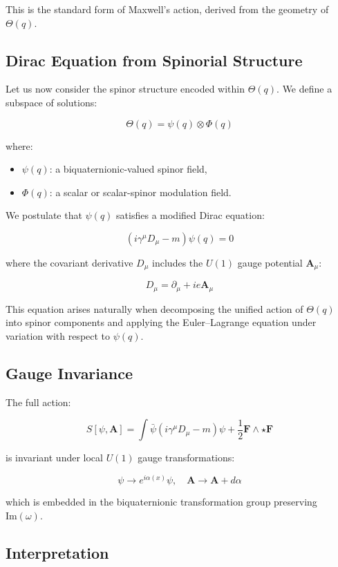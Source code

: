 This is the standard form of Maxwell's action, derived from the geometry of \(\Theta(q)\).

\subsection*{Dirac Equation from Spinorial Structure}

Let us now consider the spinor structure encoded within \(\Theta(q)\). We define a subspace of solutions:

\[
\Theta(q) = \psi(q) \otimes \Phi(q)
\]

where:
\begin{itemize}
  \item \(\psi(q)\): a biquaternionic-valued spinor field,
  \item \(\Phi(q)\): a scalar or scalar-spinor modulation field.
\end{itemize}

We postulate that \(\psi(q)\) satisfies a modified Dirac equation:

\[
(i\gamma^\mu D_\mu - m)\psi(q) = 0
\]

where the covariant derivative \(D_\mu\) includes the \(U(1)\) gauge potential \(\mathbf{A}_\mu\):

\[
D_\mu = \partial_\mu + i e \mathbf{A}_\mu
\]

This equation arises naturally when decomposing the unified action of \(\Theta(q)\) into spinor components
and applying the Euler–Lagrange equation under variation with respect to \(\psi(q)\).

\subsection*{Gauge Invariance}

The full action:

\[
S[\psi, \mathbf{A}] = \int \bar{\psi}(i\gamma^\mu D_\mu - m)\psi + \frac{1}{2} \mathbf{F} \wedge \star \mathbf{F}
\]

is invariant under local \(U(1)\) gauge transformations:

\[
\psi \rightarrow e^{i\alpha(x)} \psi, \quad \mathbf{A} \rightarrow \mathbf{A} + d\alpha
\]

which is embedded in the biquaternionic transformation group preserving \(\text{Im}(\omega)\).

\subsection*{Interpretation}

